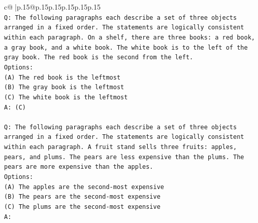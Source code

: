 \documentclass{article}
\begin{document}
{\begin{supertabular}{c@{$\;$}|p{.15\linewidth}@{}p{.15\linewidth}p{.15\linewidth}p{.15\linewidth}p{.15\linewidth}p{.15\linewidth}}
{{{\\ 
\texttt{Q: The following paragraphs each describe a set of three objects arranged in a fixed order. The statements are logically consistent within each paragraph. On a shelf, there are three books: a red book, a gray book, and a white book. The white book is to the left of the gray book. The red book is the second from the left.} \\
\texttt{Options:} \\
\texttt{(A) The red book is the leftmost} \\
\texttt{(B) The gray book is the leftmost} \\
\texttt{(C) The white book is the leftmost} \\
\texttt{A: (C)} \\
\\ 
\texttt{Q: The following paragraphs each describe a set of three objects arranged in a fixed order. The statements are logically consistent within each paragraph. A fruit stand sells three fruits: apples, pears, and plums. The pears are less expensive than the plums. The pears are more expensive than the apples.} \\
\texttt{Options:} \\
\texttt{(A) The apples are the second{-}most expensive} \\
\texttt{(B) The pears are the second{-}most expensive} \\
\texttt{(C) The plums are the second{-}most expensive} \\
\texttt{A:} \\
            }
        }
    }
     \\ \\


\end{supertabular}}
\end{document}
